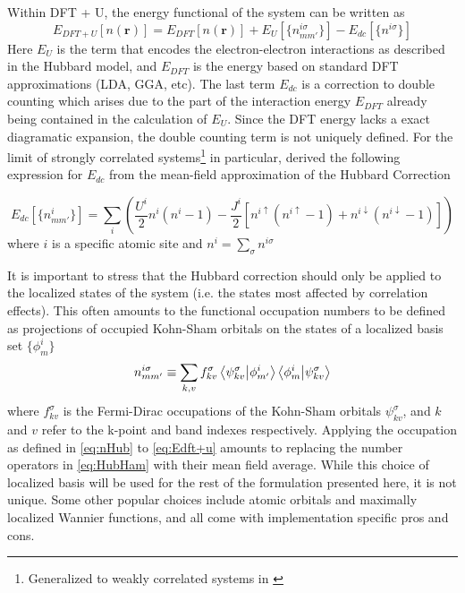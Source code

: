\documentclass[12pt]{article}
\newcommand{\lrp}[1]{\left( #1 \right)}
\newcommand{\lrb}[1]{\left[ #1 \right]}
\begin{document}
Within DFT + U, the energy functional of the system can be written as 
\begin{equation}\label{eq:Edft+u}
    E_{DFT+U}[n(\textbf{r})] = E_{DFT}[n(\textbf{r})] + E_{U}[\{n^{i\sigma}_{mm'}\}]-E_{dc}[\{n^{i\sigma}\}]
\end{equation}
Here $E_U$ is the term that encodes the electron-electron interactions as described in the Hubbard model, and $E_{DFT}$ is the energy based on standard DFT approximations (LDA, GGA, etc). The last term $E_{dc}$ is a correction to double counting which arises due to the part of the interaction energy $E_{DFT}$ already being contained in the calculation of $E_U$. Since the DFT energy lacks a exact diagramatic expansion, the double counting term is not uniquely defined. For the limit of strongly correlated systems\footnote{Generalized to weakly correlated systems in \cite{Edc_general}} in particular, \cite{DFT+Uformulation} derived the following expression for $E_{dc}$ from the mean-field approximation of the Hubbard Correction  

\begin{equation*}
    E_{dc}[\{n^i_{mm'}\}] = 
    \sum_i\lrp{\frac{U^i}{2}n^i\lrp{n^i-1}-\frac{J^i}{2}\lrb{n^{i\uparrow}\lrp{n^{i\uparrow}-1}+n^{i\downarrow}\lrp{n^{i\downarrow}-1}}}
\end{equation*}
where  $i$ is a specific atomic site and $n^i = \sum_{\sigma}n^{i\sigma}$

It is important to stress that the Hubbard correction should only be applied to the localized states of the system (i.e. the states most affected by correlation effects). This often amounts to the functional occupation numbers to be defined as projections of occupied Kohn-Sham orbitals on the states of a localized basis set $\{\phi^i_{m}\}$
\begin{equation}\label{eq:nHub}
    n^{i\sigma}_{mm'} \equiv \sum_{k,v}f^\sigma_{kv}\bra{\psi^\sigma_{kv}}\ket{\phi^i_{m'}}\bra{\phi^i_{m}}\ket{\psi^\sigma_{kv}}
\end{equation}
where $f^\sigma_{kv}$ is the Fermi-Dirac occupations of the Kohn-Sham orbitals $\psi^\sigma_{kv}$, and $k$ and $v$ refer to the k-point and band indexes respectively. Applying the occupation as defined in \eqref{eq:nHub} to \eqref{eq:Edft+u} amounts to replacing the number operators in \eqref{eq:HubHam} with their mean field average. While this choice of localized basis will be used for the rest of the formulation presented here, it is not unique. Some other popular choices include atomic orbitals and maximally localized Wannier functions, and all come with implementation specific pros and cons. 
\end{document}
